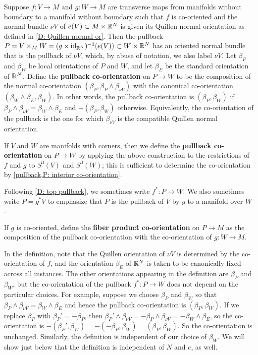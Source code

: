 \begin{definition}\label{D: pullback coorient}
	Suppose $f \colon V \to M$ and $g \colon W \to M$ are transverse maps from manifolds without boundary to a manifold without boundary such that $f$ is co-oriented and the normal bundle $\nu V$ of $e(V) \subset M \times \mathbb{R}^N$ is given its Quillen normal orientation as defined in \cref{D: Quillen normal or}.
	Then the pullback $P = V \times_M W = (g \times \mathrm{id}_{\mathbb{R}^N})^{-1}(e(V)) \subset W \times \mathbb{R}^N$ has an oriented normal bundle that is the pullback of $\nu V$, which, by abuse of notation, we also label $\nu V$.
	Let $\beta_P$ and $\beta_W$ be local orientations of $P$ and $W$, and let $\beta_E$ be the standard orientation of $\mathbb{R}^N$.
	Define the \textbf{pullback co-orientation} on $P \to W$ to be the composition of the normal co-orientation $(\beta_P,\beta_P \wedge \beta_{\nu V})$ with the canonical co-orientation $(\beta_W \wedge \beta_E,\beta_W)$.
	In other words, the pullback co-orientation is $(\beta_P,\beta_W)$ if $\beta_P \wedge \beta_{\nu V} = \beta_W \wedge \beta_E$ and $-(\beta_P,\beta_W)$ otherwise.
  Equivalently, the co-orientation of the pullback is the one for which $\beta_{\nu V}$ is the compatible Quillen normal orientation.

	If $V$ and $W$ are manifolds with corners, then we define the \textbf{pullback co-orientation} on $P \to W$ by applying the above construction to the restrictions of $f$ and $g$ to $S^0(V)$ and $S^0(W)$; this is sufficient to determine the co-orientation by \cref{pullback,P: interior co-orientation}.

	Following \cref{D: top pullback}, we sometimes write $f^* \colon P \to W$.
	We also sometimes write $P = g^*V$ to emphasize that $P$ is the pullback of $V$ by $g$ to a manifold over $W$.

	If $g$ is co-oriented, define the \textbf{fiber product co-orientation} on $P \to M$ as the composition of the pullback co-orientation with the co-orientation of $g \colon W \to M$.
\end{definition}

In the definition, note that the Quillen orientation of $\nu V$ is determined by the co-orientation of $f$, and the orientation $\beta_E$ of $\mathbb{R}^N$ is taken to be canonically fixed across all instances.
The other orientations appearing in the definition are $\beta_P$ and $\beta_W$, but the co-orientation of the pullback $f^* \colon P \to W$ does not depend on the particular choices.
For example, suppose we choose $\beta_P$ and $\beta_W$ so that $\beta_P \wedge \beta_{\nu V} = \beta_W \wedge \beta_E$ and hence the pullback co-orientation is $(\beta_P,\beta_W)$.
If we replace $\beta_P$ with $\beta_P' = -\beta_P$, then
$\beta_P' \wedge \beta_{\nu V} = -\beta_P \wedge \beta_{\nu V} = -\beta_W \wedge \beta_E$, so the co-orientation is $-(\beta_P',\beta_W) = -(-\beta_P,\beta_W) = (\beta_P,\beta_W)$.
So the co-orientation is unchanged.
Similarly, the definition is independent of our choice of $\beta_W$.
We will show just below that the definition is independent of $N$ and $e$, as well.

